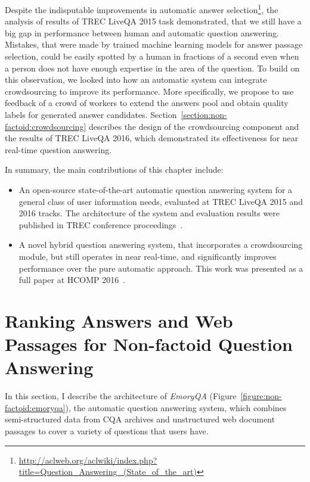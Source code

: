 Despite the indisputable improvements in automatic answer selection\footnote{\href{url}{http://aclweb.org/aclwiki/index.php?title=Question\_Answering\_(State\_of\_the\_art)}}, the analysis of results of TREC LiveQA 2015 task demonstrated, that we still have a big gap in performance between human and automatic question answering.
Mistakes, that were made by trained machine learning models for answer passage selection, could be easily spotted by a human in fractions of a second even when a person does not have enough expertise in the area of the question.
To build on this observation, we looked into how an automatic system can integrate crowdsourcing to improve its performance.
More specifically, we propose to use feedback of a crowd of workers to extend the answers pool and obtain quality labels for generated answer candidates.
Section~\ref{section:non-factoid:crowdsourcing} describes the design of the crowdsourcing component and the results of TREC LiveQA 2016, which demonstrated its effectiveness for near real-time question answering.

In summary, the main contributions of this chapter include:
\begin{itemize}
\item An open-source state-of-the-art automatic question answering system for a general class of user information needs, evaluated at TREC LiveQA 2015 and 2016 tracks.
The architecture of the system and evaluation results were published in TREC conference proceedings~\cite{savenkov_liveqa15,savenkov2016trec}.
\item A novel hybrid question answering system, that incorporates a crowdsourcing module, but still operates in near real-time, and significantly improves performance over the pure automatic approach.
This work was presented as a full paper at HCOMP 2016~\cite{savenkov_crqa2016}.
\end{itemize}

\section{Ranking Answers and Web Passages for Non-factoid Question Answering}
\label{section:non-factoid:system}

In this section, I describe the architecture of \textit{EmoryQA} (Figure~\ref{figure:non-factoid:emoryqa}), the automatic question answering system, which combines semi-structured data from CQA archives and unstructured web document passages to cover a variety of questions that users have.

